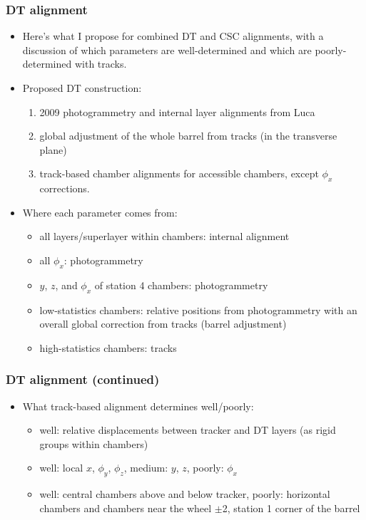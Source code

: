 \documentclass[compress]{beamer}
\begin{document}
\begin{frame}
\frametitle{DT alignment}

\begin{itemize}
\item Here's what I propose for combined DT and CSC alignments, with a
discussion of which parameters are well-determined and which are
poorly-determined with tracks.

\item Proposed DT construction:
\begin{enumerate}
\item 2009 photogrammetry and internal layer alignments from Luca
\item global adjustment of the whole barrel from tracks (in the transverse plane)
\item track-based chamber alignments for accessible chambers, except $\phi_x$ corrections.
\end{enumerate}

\item Where each parameter comes from:
\begin{itemize}
\item all layers/superlayer within chambers: internal alignment
\item all $\phi_x$: photogrammetry
\item $y$, $z$, and $\phi_x$ of station 4 chambers: photogrammetry
\item low-statistics chambers: relative positions from photogrammetry
with an overall global correction from tracks (barrel adjustment)
\item high-statistics chambers: tracks
\end{itemize}

\end{itemize}
\end{frame}

\begin{frame}
\frametitle{DT alignment (continued)}

\begin{itemize}
\item What track-based alignment determines well/poorly:
\begin{itemize}
\item well: relative displacements between tracker and DT layers (as
rigid groups within chambers)
\item well: local $x$, $\phi_y$, $\phi_z$, medium: $y$, $z$, poorly: $\phi_x$
\item well: central chambers above and below tracker, poorly: horizontal
chambers and chambers near the wheel $\pm$2, station 1 corner of the
barrel
\end{itemize}

\end{itemize}
\end{frame}
\end{document}
